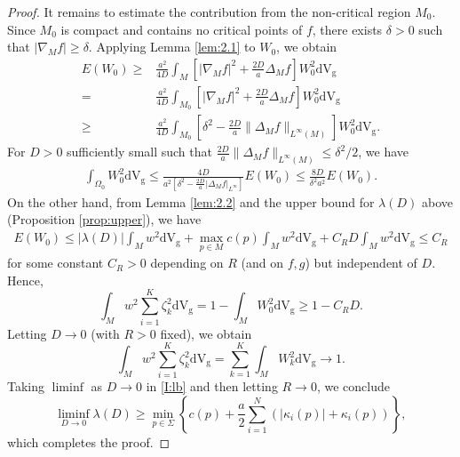\documentclass[10pt,a4paper]{amsart}
\newcommand{\V}{\mathrm{d} \mathrm{V_g}}
\newcommand{\grad}{\nabla_M}
\begin{document}
\begin{proof}
It remains to estimate the contribution from the non-critical region \(M_0\). Since \(M_0\) is compact and contains no critical points of \(f\), there exists \(\delta>0\) such that \(|\grad f| \geq \delta\). Applying Lemma \ref{lem:2.1} to \(W_0\), we obtain
\begin{align*}
E(W_0)\ge &\frac{a^2}{4D}  \int_{M} \left[ | \nabla_M f|^2 +
     \frac{2D}{a} \Delta_M f \right] W_0^2 \mathrm{d} \mathrm{V_g}\\
     =&\frac{a^2}{4D}  \int_{M_0} \left[ | \nabla_M f|^2 +
     \frac{2D}{a} \Delta_M f \right] W_0^2 \mathrm{d} \mathrm{V_g}\\
     \ge& \frac{a^2}{4D}  \int_{M_0} \left[ \delta^2 -
     \frac{2D}{a} \|\Delta_M f \|_{L^\infty(M)}\right] W_0^2 \mathrm{d} \mathrm{V_g}.
\end{align*}
For $D>0$ sufficiently small such that 
\(\frac{2D}{a}\|\Delta_M f\|_{L^\infty(M)} \le \delta^2/2\), we have
\begin{align*}
\int_{\Omega_0}  W_0^2 \mathrm{d} \mathrm{V_g}\leq
\frac{4D}{a^2\left[ \delta^2 -
     \frac{2D}{a} |\Delta_M f |_{L^\infty}\right]}E(W_0)\leq \frac{8 D}{\delta^2 a^2}E(W_0).
\end{align*}
On the other hand, from Lemma \ref{lem:2.2} and the upper bound for $\lambda(D)$ above (Proposition \ref{prop:upper}), we have 
\begin{align*}
E(W_0)\leq |\lambda(D)|\int_M w^2\V+\max_{p\in M}c(p)\int_M w^2\V+C_R D\int_M w^2\V \leq C_R
\end{align*}
for some constant \(C_R>0\) depending on \(R\) (and on \(f,g\)) but independent of \(D\). Hence,    
\[
\int_Mw^2 \sum_{i=1}^K \zeta_k^2\V=1-\int_M W_0^2 \V\ge 1-C_R D.
\]
Letting \(D\to0\) (with \(R>0\) fixed), we obtain
\[
\int_Mw^2 \sum_{i=1}^K \zeta_k^2\V=\sum_{k=1}^K \int_M W_k^2 \V \to 1.
\]
Taking \(\liminf\) as \(D \to 0\) in \eqref{I:lb} and then letting \(R \to 0\), we conclude
\[
\liminf_{D \to 0} \lambda(D) \geq \min_{p \in \Sigma} \left\{ c(p) + \frac{a}{2} \sum_{i=1}^N (|\kappa_i(p)| + \kappa_i(p)) \right\},
\]
which completes the proof.  
\end{proof}
\end{document}
